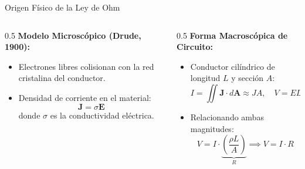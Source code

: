 \documentclass[10pt, aspectratio=169, handout]{beamer}
\begin{document}
\primeraDiapo

\begin{frame}{Origen Físico de la Ley de Ohm}
    \begin{columns}[T]
        \pause
        \begin{column}{0.5\textwidth}
            \textbf{Modelo Microscópico (Drude, 1900):}
            \begin{itemize}
                \item Electrones libres colisionan con la red cristalina del conductor.
                \item Densidad de corriente en el material:
                      \[ \bm{J} = \sigma \bm{E} \]
                      donde $\sigma$ es la conductividad eléctrica.
            \end{itemize}
        \end{column}
        \begin{column}{0.5\textwidth}
            \pause
            \textbf{Forma Macroscópica de Circuito:}
            \begin{itemize}
                \item<+-> Conductor cilíndrico de longitud $L$ y sección $A$:
                      \[ I = \iint \bm{J} \cdot d\bm{A} \approx J A, \quad V = E L \]
                \item<+-> Relacionando ambas magnitudes:
                      \[ V = I \cdot \underbrace{\left(\frac{\rho L}{A}\right)}_{R} \implies V = I \cdot R \]
            \end{itemize}
        \end{column}
    \end{columns}
\end{frame}
\end{document}
